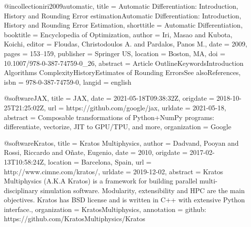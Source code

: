 @incollection{iri2009automatic,
  title = {Automatic Differentiation: Introduction, History and Rounding Error {{estimationAutomatic Differentiation}}: {{Introduction}}, {{History}} and {{Rounding Error Estimation}}},
  shorttitle = {Automatic Differentiation},
  booktitle = {Encyclopedia of {{Optimization}}},
  author = {Iri, Masao and Kubota, Koichi},
  editor = {Floudas, Christodoulos A. and Pardalos, Panos M.},
  date = {2009},
  pages = {153--159},
  publisher = {Springer US},
  location = {Boston, MA},
  doi = {10.1007/978-0-387-74759-0_26},
  abstract = {Article OutlineKeywordsIntroduction Algorithms ComplexityHistoryEstimates of Rounding ErrorsSee alsoReferences},
  isbn = {978-0-387-74759-0},
  langid = {english}
}

@software{JAX,
  title = {{{JAX}}},
  date = {2021-05-18T09:38:32Z},
  origdate = {2018-10-25T21:25:02Z},
  url = {https://github.com/google/jax},
  urldate = {2021-05-18},
  abstract = {Composable transformations of Python+NumPy programs: differentiate, vectorize, JIT to GPU/TPU, and more},
  organization = {Google}
}

@software{Kratos,
  title = {Kratos {{Multiphysics}}},
  author = {Dadvand, Pooyan and Rossi, Riccardo and Oñate, Eugenio},
  date = {2010},
  origdate = {2017-02-13T10:58:24Z},
  location = {Barcelona, Spain},
  url = {http://www.cimne.com/kratos/},
  urldate = {2019-12-02},
  abstract = {Kratos Multiphysics (A.K.A Kratos) is a framework for building parallel multi-disciplinary simulation software. Modularity, extensibility and HPC are the main objectives. Kratos has BSD license and is written in C++ with extensive Python interface.},
  organization = {KratosMultiphysics},
  annotation = {github: https://github.com/KratosMultiphysics/Kratos}
}

